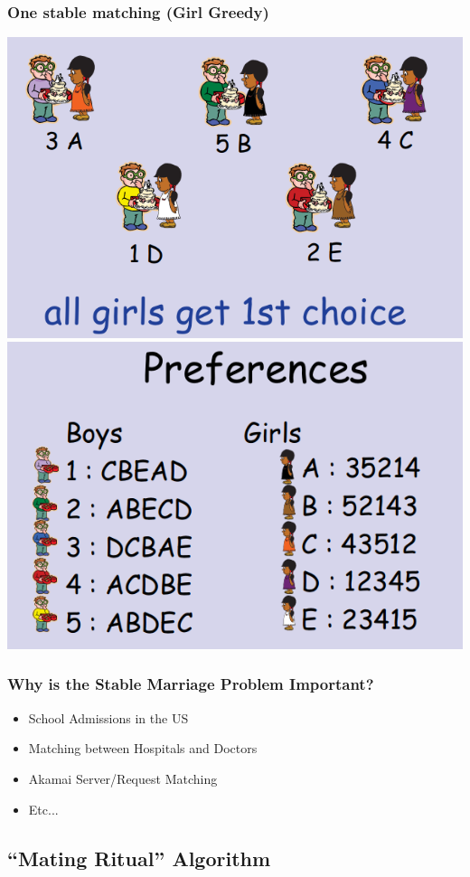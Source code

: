 \documentclass{beamer}
\begin{document}
\begin{frame}
  \frametitle{One stable matching (Girl Greedy)}
  \begin{center}
    \includegraphics[width=.45\textwidth]{../img/marriage8}
    \includegraphics[width=.45\textwidth]{../img/marriage2}
  \end{center}
\end{frame}

\begin{frame}
  \frametitle{Why is the Stable Marriage Problem Important?}

  {\larger
    \begin{itemize}
    \item School Admissions in the US

      \bigskip
      
    \item Matching between Hospitals and Doctors

      \bigskip
      
    \item Akamai Server/Request Matching

      \bigskip
      
    \item Etc...
    \end{itemize}
  }
\end{frame}

\subsection{``Mating Ritual'' Algorithm}
\end{document}

